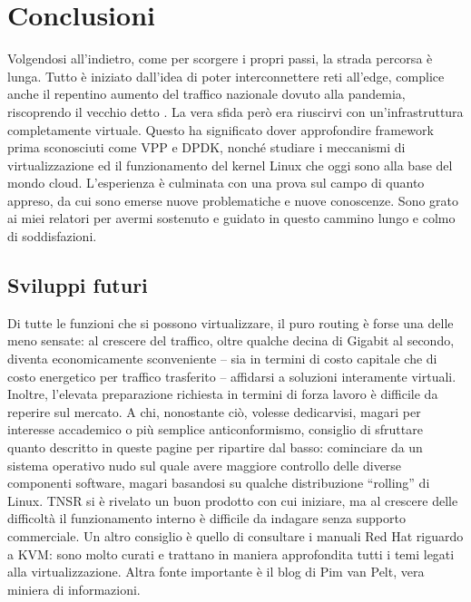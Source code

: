 \chapter{Conclusioni}
\label{chap:conclusioni}

Volgendosi all'indietro, come per scorgere i propri passi, la strada percorsa è lunga. Tutto è iniziato dall'idea di poter interconnettere reti all'edge, complice anche il repentino aumento del traffico nazionale dovuto alla pandemia, riscoprendo il vecchio detto \textit{}. La vera sfida però era riuscirvi con un'infrastruttura completamente virtuale. Questo ha significato dover approfondire framework prima sconosciuti come VPP e DPDK, nonché studiare i meccanismi di virtualizzazione ed il funzionamento del kernel Linux che oggi sono alla base del mondo cloud. L'esperienza è culminata con una prova sul campo di quanto appreso, da cui sono emerse nuove problematiche e nuove conoscenze. Sono grato ai miei relatori per avermi sostenuto e guidato in questo cammino lungo e colmo di soddisfazioni.

\section{Sviluppi futuri}

Di tutte le funzioni che si possono virtualizzare, il puro routing è forse una delle meno sensate: al crescere del traffico, oltre qualche decina di Gigabit al secondo, diventa economicamente sconveniente -- sia in termini di costo capitale che di costo energetico per traffico trasferito -- affidarsi a soluzioni interamente virtuali. Inoltre, l'elevata preparazione richiesta in termini di forza lavoro è difficile da reperire sul mercato. A chi, nonostante ciò, volesse dedicarvisi, magari per interesse accademico o più semplice anticonformismo, consiglio di sfruttare quanto descritto in queste pagine per ripartire dal basso: cominciare da un sistema operativo nudo sul quale avere maggiore controllo delle diverse componenti software, magari basandosi su qualche distribuzione ``rolling'' di Linux. TNSR si è rivelato un buon prodotto con cui iniziare, ma al crescere delle difficoltà il funzionamento interno è difficile da indagare senza supporto commerciale. Un altro consiglio è quello di consultare i manuali Red Hat riguardo a KVM: sono molto curati e trattano in maniera approfondita tutti i temi legati alla virtualizzazione. Altra fonte importante è il blog di Pim van Pelt, vera miniera di informazioni.


